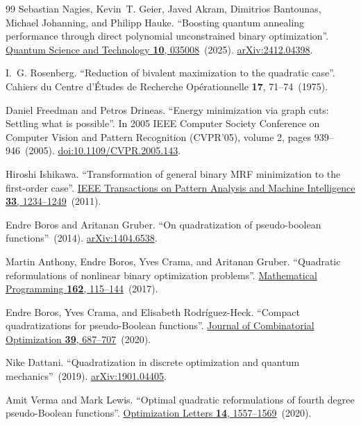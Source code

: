 \documentclass[a4paper,onecolumn,11pt,unpublished]{quantumarticle}
\theoremstyle{remark}
\begin{document}
\begin{thebibliography}{99}
Sebastian Nagies, Kevin~T. Geier, Javed Akram, Dimitrios Bantounas, Michael Johanning, and Philipp Hauke.
\newblock ``Boosting quantum annealing performance through direct polynomial unconstrained binary optimization''.
\newblock \href{https://dx.doi.org/10.1088/2058-9565/adcae6}{Quantum Science and Technology {\bf 10}, 035008}~(2025).
\newblock \href{http://arxiv.org/abs/2412.04398}{arXiv:2412.04398}.

I.~G. Rosenberg.
\newblock ``Reduction of bivalent maximization to the quadratic case''.
\newblock Cahiers du Centre d'\'Etudes de Recherche Op\'erationnelle {\bf 17}, 71--74~(1975).

Daniel Freedman and Petros Drineas.
\newblock ``Energy minimization via graph cuts: Settling what is possible''.
\newblock In 2005 IEEE Computer Society Conference on Computer Vision and Pattern Recognition (CVPR'05), volume 2, pages 939--946~(2005).
\newblock \href{https://dx.doi.org/10.1109/CVPR.2005.143}{doi:10.1109/CVPR.2005.143}.

Hiroshi Ishikawa.
\newblock ``Transformation of general binary MRF minimization to the first-order case''.
\newblock \href{https://dx.doi.org/10.1109/TPAMI.2010.91}{IEEE Transactions on Pattern Analysis and Machine Intelligence {\bf 33}, 1234--1249}~(2011).

Endre Boros and Aritanan Gruber.
\newblock ``On quadratization of pseudo-boolean functions''~(2014).
\newblock \href{http://arxiv.org/abs/1404.6538}{arXiv:1404.6538}.

Martin Anthony, Endre Boros, Yves Crama, and Aritanan Gruber.
\newblock ``Quadratic reformulations of nonlinear binary optimization problems''.
\newblock \href{https://dx.doi.org/10.1007/s10107-016-1032-4}{Mathematical Programming {\bf 162}, 115--144}~(2017).

Endre Boros, Yves Crama, and Elisabeth Rodr{\'i}guez-Heck.
\newblock ``Compact quadratizations for pseudo-Boolean functions''.
\newblock \href{https://dx.doi.org/10.1007/s10878-019-00511-0}{Journal of Combinatorial Optimization {\bf 39}, 687--707}~(2020).

Nike Dattani.
\newblock ``Quadratization in discrete optimization and quantum mechanics''~(2019).
\newblock \href{http://arxiv.org/abs/1901.04405}{arXiv:1901.04405}.

Amit Verma and Mark Lewis.
\newblock ``Optimal quadratic reformulations of fourth degree pseudo-Boolean functions''.
\newblock \href{https://dx.doi.org/10.1007/s11590-019-01460-7}{Optimization Letters {\bf 14}, 1557--1569}~(2020).


\end{thebibliography}
\end{document}
